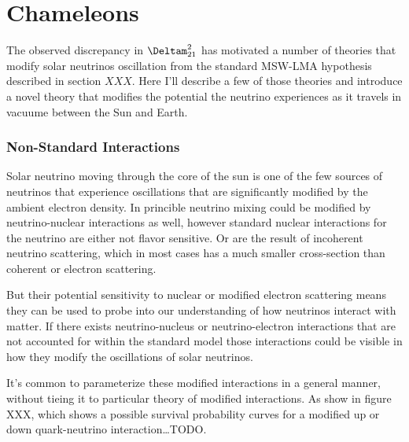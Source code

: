 
\chapter{Chameleons}

\ifpdf
    \graphicspath{{chameleons}{chameleons/figures/PDF/}{chameleons/figures/}}
\else
    \graphicspath{{chameleons/figures/EPS/}{chameleons/figures/}}
\fi


The observed discrepancy in $\Deltam^{2}_{21}$ has motivated a number
of theories that modify solar neutrinos oscillation from the standard
MSW-LMA hypothesis described in section $XXX$.
Here I'll describe a few of those theories and introduce a novel theory
that modifies the potential the neutrino experiences as it travels in
vacuume between the Sun and Earth.

\subsection{Non-Standard Interactions}
Solar neutrino moving through the core of the sun is one of the few sources
of neutrinos that experience oscillations that are significantly modified by
the ambient electron density.
In princible neutrino mixing could be modified by neutrino-nuclear interactions
as well, however standard nuclear interactions for the neutrino are either
not flavor sensitive. Or are the result of incoherent neutrino scattering, which
in most cases has a much smaller  cross-section than coherent or electron scattering.


But their potential sensitivity to nuclear or modified electron scattering
means they can be used to probe into our understanding of how neutrinos
interact with matter.
If there exists neutrino-nucleus or neutrino-electron interactions that are
not accounted for within the standard model those interactions could be visible
in how they modify the oscillations of solar neutrinos.


It's common to parameterize these modified interactions in a general manner,
without tieing it to particular theory of modified interactions. As show in
figure XXX, which shows a possible survival probability curves for a modified
up or down quark-neutrino interaction\ldots TODO.\@

